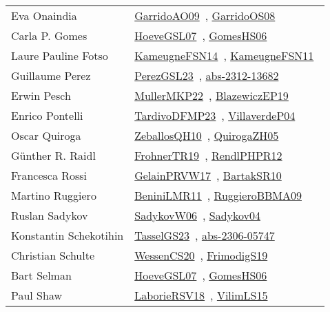 {\begin{longtable}{p{4cm}p{20cm}}
Eva Onaindia & \href{works/GarridoAO09.pdf}{GarridoAO09}~\cite{GarridoAO09}, \href{works/GarridoOS08.pdf}{GarridoOS08}~\cite{GarridoOS08}\\
Carla P. Gomes & \href{works/HoeveGSL07.pdf}{HoeveGSL07}~\cite{HoeveGSL07}, \href{works/GomesHS06.pdf}{GomesHS06}~\cite{GomesHS06}\\
Laure Pauline Fotso & \href{works/KameugneFSN14.pdf}{KameugneFSN14}~\cite{KameugneFSN14}, \href{works/KameugneFSN11.pdf}{KameugneFSN11}~\cite{KameugneFSN11}\\
Guillaume Perez & \href{works/PerezGSL23.pdf}{PerezGSL23}~\cite{PerezGSL23}, \href{works/abs-2312-13682.pdf}{abs-2312-13682}~\cite{abs-2312-13682}\\
Erwin Pesch & \href{works/MullerMKP22.pdf}{MullerMKP22}~\cite{MullerMKP22}, \href{}{BlazewiczEP19}~\cite{BlazewiczEP19}\\
Enrico Pontelli & \href{works/TardivoDFMP23.pdf}{TardivoDFMP23}~\cite{TardivoDFMP23}, \href{}{VillaverdeP04}~\cite{VillaverdeP04}\\
Oscar Quiroga & \href{works/ZeballosQH10.pdf}{ZeballosQH10}~\cite{ZeballosQH10}, \href{works/QuirogaZH05.pdf}{QuirogaZH05}~\cite{QuirogaZH05}\\
G{\"{u}}nther R. Raidl & \href{works/FrohnerTR19.pdf}{FrohnerTR19}~\cite{FrohnerTR19}, \href{works/RendlPHPR12.pdf}{RendlPHPR12}~\cite{RendlPHPR12}\\
Francesca Rossi & \href{works/GelainPRVW17.pdf}{GelainPRVW17}~\cite{GelainPRVW17}, \href{works/BartakSR10.pdf}{BartakSR10}~\cite{BartakSR10}\\
Martino Ruggiero & \href{works/BeniniLMR11.pdf}{BeniniLMR11}~\cite{BeniniLMR11}, \href{works/RuggieroBBMA09.pdf}{RuggieroBBMA09}~\cite{RuggieroBBMA09}\\
Ruslan Sadykov & \href{works/SadykovW06.pdf}{SadykovW06}~\cite{SadykovW06}, \href{works/Sadykov04.pdf}{Sadykov04}~\cite{Sadykov04}\\
Konstantin Schekotihin & \href{works/TasselGS23.pdf}{TasselGS23}~\cite{TasselGS23}, \href{works/abs-2306-05747.pdf}{abs-2306-05747}~\cite{abs-2306-05747}\\
Christian Schulte & \href{works/WessenCS20.pdf}{WessenCS20}~\cite{WessenCS20}, \href{works/FrimodigS19.pdf}{FrimodigS19}~\cite{FrimodigS19}\\
Bart Selman & \href{works/HoeveGSL07.pdf}{HoeveGSL07}~\cite{HoeveGSL07}, \href{works/GomesHS06.pdf}{GomesHS06}~\cite{GomesHS06}\\
Paul Shaw & \href{works/LaborieRSV18.pdf}{LaborieRSV18}~\cite{LaborieRSV18}, \href{works/VilimLS15.pdf}{VilimLS15}~\cite{VilimLS15}\\

\end{longtable}}

